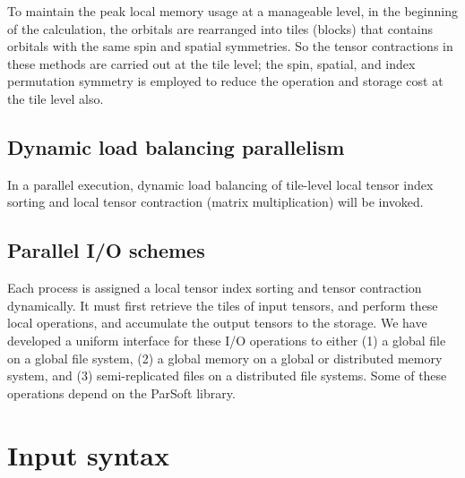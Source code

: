 To maintain the peak local memory usage at a manageable level, in the beginning of the calculation,
the orbitals are rearranged into tiles (blocks) that contains orbitals with the same spin and spatial
symmetries.  So the tensor contractions in these methods are carried out at the tile level; the spin,
spatial, and index permutation symmetry is employed to reduce the operation and storage cost at the tile 
level also.

\subsection{Dynamic load balancing parallelism}

In a parallel execution, dynamic load balancing of tile-level local tensor index sorting and local 
tensor contraction (matrix multiplication) will be invoked.

\subsection{Parallel I/O schemes}

Each process is assigned a local tensor index sorting and tensor contraction dynamically.  It must first
retrieve the tiles of input tensors, and perform these local operations, and accumulate the output
tensors to the storage.  We have developed a uniform interface for these I/O operations to either
(1) a global file on a global file system, (2) a global memory on a global or distributed memory system,
and (3) semi-replicated files on a distributed file systems.  Some of these operations depend on 
the ParSoft library.

\section{Input syntax}

